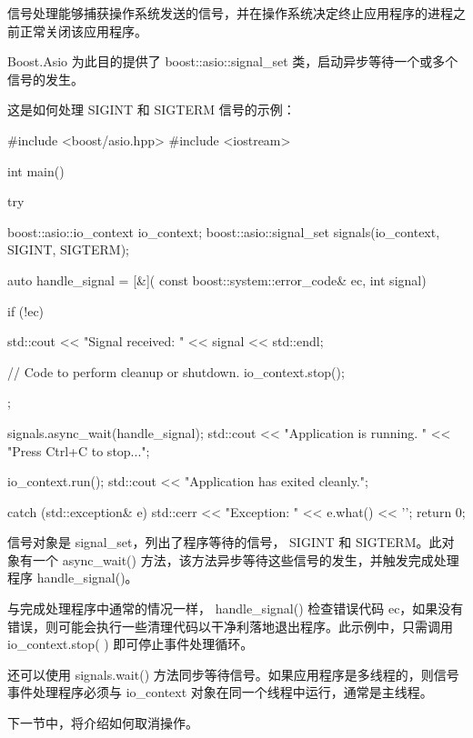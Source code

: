 

信号处理能够捕获操作系统发送的信号，并在操作系统决定终止应用程序的进程之前正常关闭该应用程序。

Boost.Asio 为此目的提供了 boost::asio::signal\_set 类，启动异步等待一个或多个信号的发生。

这是如何处理 SIGINT 和 SIGTERM 信号的示例：

\begin{cpp}
#include <boost/asio.hpp>
#include <iostream>

int main() {
    try {
        boost::asio::io_context io_context;
        boost::asio::signal_set signals(io_context,
                                SIGINT, SIGTERM);

        auto handle_signal = [&](
                const boost::system::error_code& ec,
                int signal) {
            if (!ec) {
                std::cout << "Signal received: "
                          << signal << std::endl;

                // Code to perform cleanup or shutdown.
                io_context.stop();
            }
        };

        signals.async_wait(handle_signal);
        std::cout << "Application is running. "
                  << "Press Ctrl+C to stop...\n";

        io_context.run();
        std::cout << "Application has exited cleanly.\n";
    } catch (std::exception& e) {
        std::cerr << "Exception: " << e.what() << '\n';
    }
    return 0;
}
\end{cpp}

信号对象是 signal\_set，列出了程序等待的信号， SIGINT 和 SIGTERM。此对象有一个 async\_wait() 方法，该方法异步等待这些信号的发生，并触发完成处理程序 handle\_signal()。

与完成处理程序中通常的情况一样， handle\_signal() 检查错误代码 ec，如果没有错误，则可能会执行一些清理代码以干净利落地退出程序。此示例中，只需调用 io\_context.stop( ) 即可停止事件处理循环。

还可以使用 signals.wait() 方法同步等待信号。如果应用程序是多线程的，则信号事件处理程序必须与 io\_context 对象在同一个线程中运行，通常是主线程。

下一节中，将介绍如何取消操作。










